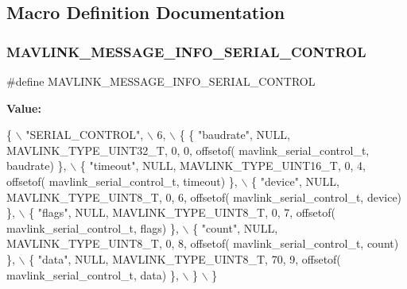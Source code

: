 \subsection{Macro Definition Documentation}
\mbox{\label{mavlink__msg__serial__control_8h_a311d3f3349061cce54159e825c310d21}} 
\subsubsection{M\+A\+V\+L\+I\+N\+K\+\_\+\+M\+E\+S\+S\+A\+G\+E\+\_\+\+I\+N\+F\+O\+\_\+\+S\+E\+R\+I\+A\+L\+\_\+\+C\+O\+N\+T\+R\+OL}
{\footnotesize\ttfamily \#define M\+A\+V\+L\+I\+N\+K\+\_\+\+M\+E\+S\+S\+A\+G\+E\+\_\+\+I\+N\+F\+O\+\_\+\+S\+E\+R\+I\+A\+L\+\_\+\+C\+O\+N\+T\+R\+OL}

{\bfseries Value\+:}
\begin{DoxyCode}
\{ \(\backslash\)
    \textcolor{stringliteral}{"SERIAL\_CONTROL"}, \(\backslash\)
    6, \(\backslash\)
    \{  \{ \textcolor{stringliteral}{"baudrate"}, NULL, MAVLINK_TYPE_UINT32_T, 0, 0, offsetof(
      mavlink_serial_control_t, baudrate) \}, \(\backslash\)
         \{ \textcolor{stringliteral}{"timeout"}, NULL, MAVLINK_TYPE_UINT16_T, 0, 4, offsetof(
      mavlink_serial_control_t, timeout) \}, \(\backslash\)
         \{ \textcolor{stringliteral}{"device"}, NULL, MAVLINK_TYPE_UINT8_T, 0, 6, offsetof(
      mavlink_serial_control_t, device) \}, \(\backslash\)
         \{ \textcolor{stringliteral}{"flags"}, NULL, MAVLINK_TYPE_UINT8_T, 0, 7, offsetof(
      mavlink_serial_control_t, flags) \}, \(\backslash\)
         \{ \textcolor{stringliteral}{"count"}, NULL, MAVLINK_TYPE_UINT8_T, 0, 8, offsetof(
      mavlink_serial_control_t, count) \}, \(\backslash\)
         \{ \textcolor{stringliteral}{"data"}, NULL, MAVLINK_TYPE_UINT8_T, 70, 9, offsetof(
      mavlink_serial_control_t, data) \}, \(\backslash\)
         \} \(\backslash\)
\}
\end{DoxyCode}
\mbox{\label{mavlink__msg__serial__control_8h_a2a777323b804826f53a8593a2ab7ace6}} 
